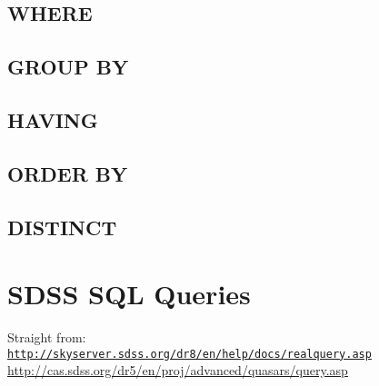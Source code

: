 \documentclass[11pt,a4paper]{article}
\begin{document}
    \subsection*{WHERE}
    \subsection*{GROUP BY}
    \subsection*{HAVING}
    \subsection*{ORDER BY}
    \subsection*{DISTINCT}
    


\newpage
\section{SDSS SQL Queries}
Straight from: \\
\href{http://skyserver.sdss.org/dr8/en/help/docs/realquery.asp}{\tt http://skyserver.sdss.org/dr8/en/help/docs/realquery.asp}\\
\href{http://cas.sdss.org/dr5/en/proj/advanced/quasars/query.asp}{http://cas.sdss.org/dr5/en/proj/advanced/quasars/query.asp}
\end{document}
